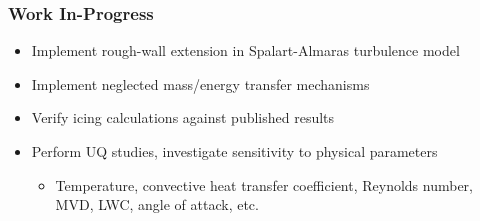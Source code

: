 \documentclass[9pt]{beamer}
\begin{document}
\begin{frame}
\frametitle{Work In-Progress}
\label{sec-4-6}

\begin{itemize}
\item Implement rough-wall extension in Spalart-Almaras turbulence model
\item Implement neglected mass/energy transfer mechanisms
\item Verify icing calculations against published results
\item Perform UQ studies, investigate sensitivity to physical parameters
\begin{itemize}
\item Temperature, convective heat transfer coefficient, Reynolds number, MVD, LWC, angle of attack, etc.
\end{itemize}
\end{itemize}
\end{frame}
\end{document}
